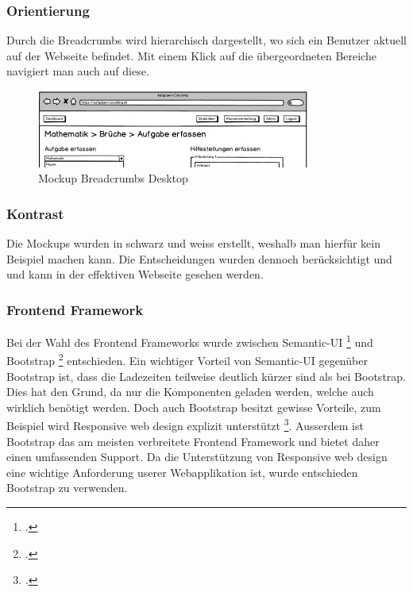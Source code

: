 \subsubsection*{Orientierung} 
Durch die Breadcrumbs wird hierarchisch dargestellt, wo sich ein Benutzer aktuell auf der Webseite befindet. Mit einem Klick auf die übergeordneten Bereiche navigiert man auch auf diese. \\

\begin{minipage}{\textwidth}
	\begin{figure}[H]
	\centering
		\includegraphics[width=0.8\textwidth, keepaspectratio]{images/Mockups/Breadcrumbs_Desktop.png}
		\caption{Mockup Breadcrumbs Desktop}
	\end{figure}
\end{minipage}


\subsubsection*{Kontrast}
Die Mockups wurden in schwarz und weiss erstellt, weshalb man hierfür kein Beispiel machen kann. Die Entscheidungen wurden dennoch berücksichtigt und  und kann in der effektiven Webseite gesehen werden.


\subsubsection*{Frontend Framework}
Bei der Wahl des Frontend Frameworks wurde zwischen Semantic-UI \footcite{semantic_ui} und Bootstrap \footcite{bootstrap} entschieden. Ein wichtiger Vorteil von Semantic-UI gegenüber Bootstrap ist, dass die Ladezeiten teilweise deutlich kürzer sind als bei Bootstrap. Dies hat den Grund, da nur die Komponenten geladen werden, welche auch wirklich benötigt werden. Doch auch Bootstrap besitzt gewisse Vorteile, zum Beispiel wird Responsive web design explizit unterstützt \footcite{top_10_frontend_frameworks}. Ausserdem ist Bootstrap das am meisten verbreitete Frontend Framework und bietet daher einen umfassenden Support. Da die Unterstützung von Responsive web design eine wichtige Anforderung userer Webapplikation ist, wurde entschieden Bootstrap zu verwenden.


\newpage
